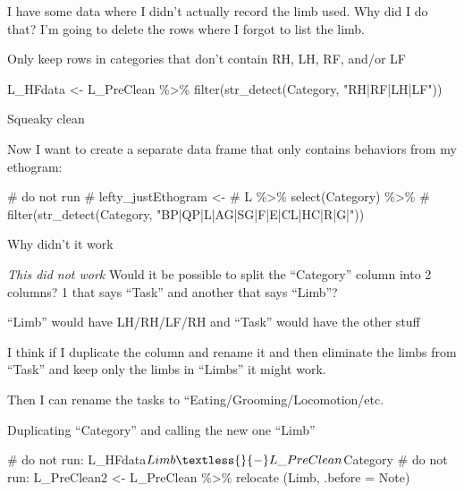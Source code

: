 \documentclass[
  letterpaper,
  DIV=11,
  numbers=noendperiod]{scrartcl}
\newenvironment{Shaded}{\begin{snugshade}}{\end{snugshade}}
\newcommand{\CommentTok}[1]{\textcolor[rgb]{0.37,0.37,0.37}{#1}}
\newcommand{\FunctionTok}[1]{\textcolor[rgb]{0.28,0.35,0.67}{#1}}
\newcommand{\NormalTok}[1]{\textcolor[rgb]{0.00,0.23,0.31}{#1}}
\newcommand{\OtherTok}[1]{\textcolor[rgb]{0.00,0.23,0.31}{#1}}
\newcommand{\SpecialCharTok}[1]{\textcolor[rgb]{0.37,0.37,0.37}{#1}}
\newcommand{\StringTok}[1]{\textcolor[rgb]{0.13,0.47,0.30}{#1}}
\begin{document}
I have some data where I didn't actually record the limb used. Why did I
do that? I'm going to delete the rows where I forgot to list the limb.

Only keep rows in categories that don't contain RH, LH, RF, and/or LF

\begin{Shaded}
\begin{Highlighting}[]
\NormalTok{L\_HFdata }\OtherTok{\textless{}{-}}
\NormalTok{  L\_PreClean }\SpecialCharTok{\%\textgreater{}\%}
  \FunctionTok{filter}\NormalTok{(}\FunctionTok{str\_detect}\NormalTok{(Category, }\StringTok{"RH|RF|LH|LF"}\NormalTok{))}
\end{Highlighting}
\end{Shaded}

Squeaky clean

Now I want to create a separate data frame that only contains behaviors
from my ethogram:

\begin{Shaded}
\begin{Highlighting}[]
\CommentTok{\# do not run }
\CommentTok{\# lefty\_justEthogram \textless{}{-}}
\CommentTok{\# L \%\textgreater{}\%  select(Category) \%\textgreater{}\%}
\CommentTok{\# filter(str\_detect(Category, "BP|QP|L|AG|SG|F|E|CL|HC|R|G|"))}
\end{Highlighting}
\end{Shaded}

Why didn't it work

\emph{This did not work} Would it be possible to split the ``Category''
column into 2 columns? 1 that says ``Task'' and another that says
``Limb''?

``Limb'' would have LH/RH/LF/RH and ``Task'' would have the other stuff

I think if I duplicate the column and rename it and then eliminate the
limbs from ``Task'' and keep only the limbs in ``Limbs'' it might work.

Then I can rename the tasks to ``Eating/Grooming/Locomotion/etc.

Duplicating ``Category'' and calling the new one ``Limb''

\begin{Shaded}
\begin{Highlighting}[]
\CommentTok{\# do not run: L\_HFdata$Limb \textless{}{-} L\_PreClean$Category}
\CommentTok{\# do not run: L\_PreClean2 \textless{}{-} L\_PreClean \%\textgreater{}\% relocate (Limb, .before = Note)}
\end{Highlighting}
\end{Shaded}
\end{document}
